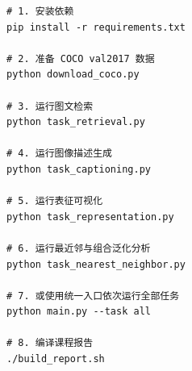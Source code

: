 \documentclass[UTF8,a4paper,10pt]{ctexart}
\begin{document}
\begin{verbatim}
# 1. 安装依赖
pip install -r requirements.txt

# 2. 准备 COCO val2017 数据
python download_coco.py

# 3. 运行图文检索
python task_retrieval.py

# 4. 运行图像描述生成
python task_captioning.py

# 5. 运行表征可视化
python task_representation.py

# 6. 运行最近邻与组合泛化分析
python task_nearest_neighbor.py

# 7. 或使用统一入口依次运行全部任务
python main.py --task all

# 8. 编译课程报告
./build_report.sh
\end{verbatim}
\end{document}
